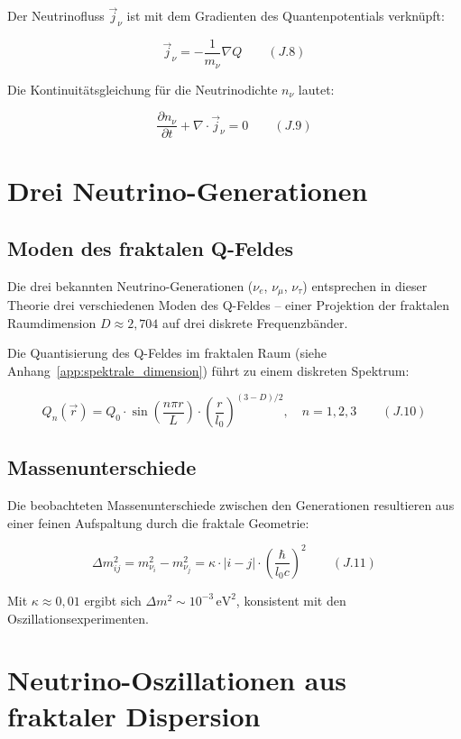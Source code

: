 Der Neutrinofluss $\vec{j}_{\nu}$ ist mit dem Gradienten des Quantenpotentials verknüpft:

\[
\vec{j}_{\nu} = -\frac{1}{m_{\nu}} \nabla Q \qquad (J.8)
\]

Die Kontinuitätsgleichung für die Neutrinodichte $n_{\nu}$ lautet:

\[
\frac{\partial n_{\nu}}{\partial t} + \nabla \cdot \vec{j}_{\nu} = 0 \qquad (J.9)
\]

\section{Drei Neutrino-Generationen}
\label{app:neutrino_oszillation_generationen}

\subsection{Moden des fraktalen Q-Feldes}
\label{sub:neutrino_oszillation_moden}

Die drei bekannten Neutrino-Generationen ($\nu_e$, $\nu_\mu$, $\nu_\tau$) entsprechen 
in dieser Theorie drei verschiedenen Moden des Q-Feldes – einer Projektion der 
fraktalen Raumdimension $D \approx 2,704$ auf drei diskrete Frequenzbänder.

Die Quantisierung des Q-Feldes im fraktalen Raum (siehe Anhang~\ref{app:spektrale_dimension}) führt zu einem 
diskreten Spektrum:

\[
Q_n(\vec{r}) = Q_0 \cdot \sin\left(\frac{n\pi r}{L}\right) \cdot \left(\frac{r}{l_0}\right)^{(3-D)/2}, \quad n = 1, 2, 3 \qquad (J.10)
\]

\subsection{Massenunterschiede}
\label{sub:neutrino_oszillation_massenunterschiede}

Die beobachteten Massenunterschiede zwischen den Generationen resultieren aus einer 
feinen Aufspaltung durch die fraktale Geometrie:

\[
\Delta m_{ij}^2 = m_{\nu_i}^2 - m_{\nu_j}^2 = \kappa \cdot |i-j| \cdot \left(\frac{\hbar}{l_0 c}\right)^2 \qquad (J.11)
\]

Mit $\kappa \approx 0,01$ ergibt sich $\Delta m^2 \sim 10^{-3}\,\text{eV}^2$, konsistent 
mit den Oszillationsexperimenten.

\section{Neutrino-Oszillationen aus fraktaler Dispersion}
\label{app:neutrino_oszillation_oszillationen}

